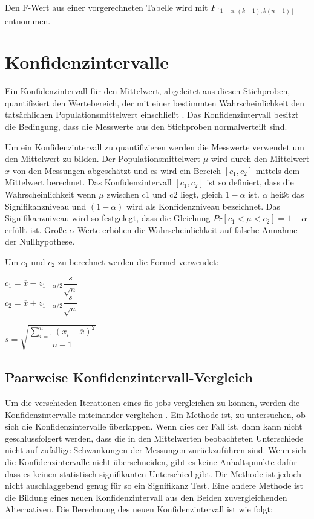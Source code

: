 Den F-Wert aus einer vorgerechneten Tabelle wird mit $F_{[1-\alpha;(k-1);k(n-1)]}$ entnommen.

\section{Konfidenzintervalle}

Ein Konfidenzintervall für den Mittelwert, abgeleitet aus diesen Stichproben, quantifiziert den Wertebereich, 
der mit einer bestimmten Wahrscheinlichkeit den tatsächlichen Populationsmittelwert einschließt \cite{statistically_rigorous}.
Das Konfidenzintervall besitzt die Bedingung, dass die Messwerte aus den Stichproben normalverteilt sind.

Um ein Konfidenzintervall zu quantifizieren werden die Messwerte verwendet um den Mittelwert zu bilden.
Der Populationsmittelwert $\mu$ wird durch den Mittelwert $\overline{x}$ von den Messungen abgeschätzt
und es wird ein Bereich $[c_1,c_2]$ mittels dem Mittelwert berechnet.
Das Konfidenzintervall $[c_1, c_2]$ ist so definiert, dass die Wahrscheinlichkeit
wenn $\mu$ zwischen c1 und c2 liegt, gleich $1 - \alpha$ ist. $\alpha$ heißt das
Signifikanzniveau und $(1 - \alpha)$ wird als Konfidenzniveau bezeichnet.
Das Signifikanzniveau wird so festgelegt, dass die Gleichung $Pr[c_1 < \mu < c_2] = 1 -\alpha$ erfüllt ist. 
Große $\alpha$ Werte erhöhen die Wahrscheinlichkeit auf falsche Annahme der Nullhypothese. 

Um $c_1$ und $c_2$ zu berechnet werden die Formel verwendet:

\begin{center}
         $c_1 = \overline{x} - z_{1-\alpha/2} \dfrac{s}{\sqrt{n}}$ \\
         $c_2 = \overline{x} + z_{1-\alpha/2} \dfrac{s}{\sqrt{n}}$ 

\end{center}


\begin{center}
         $s = \sqrt{\dfrac{\sum_{i=1}^{n} (x_i - \overline{x})^2}{n-1}}$ 
\end{center}

\subsection{Paarweise Konfidenzintervall-Vergleich}

Um die verschieden Iterationen eines fio-jobs vergleichen zu können, werden die Konfidenzintervalle miteinander verglichen \cite{statistically_rigorous}.
Ein Methode ist, zu untersuchen, ob sich die Konfidenzintervalle überlappen. Wenn dies der Fall ist, dann kann nicht
geschlussfolgert werden, dass die in den Mittelwerten beobachteten Unterschiede
nicht auf zufällige Schwankungen der Messungen zurückzuführen sind.
Wenn sich die Konfidenzintervalle nicht überschneiden, gibt es keine Anhaltspunkte dafür
dass es keinen statistisch signifikanten Unterschied gibt. Die Methode ist jedoch nicht auschlaggebend genug für so ein Signifikanz Test.
Eine andere Methode ist die Bildung eines neuen Konfidenzintervall aus den Beiden zuvergleichenden Alternativen.
Die Berechnung des neuen Konfidenzintervall ist wie folgt:

